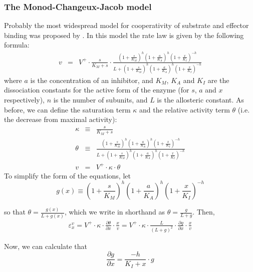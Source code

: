 \documentclass[12pt,a4paper]{article}
\begin{document}
\subsubsection{The Monod-Changeux-Jacob model}
Probably the most widespread model for cooperativity of substrate and effector binding was proposed by \citet{Monod1965-dq}. In this model the rate law is given by the following formula:
\begin{eqnarray}
v &=& V^+ \cdot \frac{s}{K_M + s} \cdot \frac{\left(1 + \frac{s}{K_M}\right)^h \left(1 + \frac{a}{K_A}\right)^h \left(1 + \frac{x}{K_I}\right)^{-h}}{L + \left(1 + \frac{s}{K_M}\right)^h \left(1 + \frac{a}{K_A}\right)^h \left(1 + \frac{x}{K_I}\right)^{-h}}
\end{eqnarray}
where $a$ is the concentration of an inhibitor, and $K_M$, $K_A$ and $K_I$ are the dissociation constants for the active form of the enzyme (for $s$, $a$ and $x$ respectively), $n$ is the number of subunits, and $L$ is the allosteric constant. As before, we can define the saturation term $\kappa$ and the relative activity term $\theta$ (i.e. the decrease from maximal activity):
\begin{eqnarray}
\kappa &\equiv& \frac{s}{K_M + s} \nonumber\\
\theta &\equiv& \frac{\left(1 + \frac{s}{K_M}\right)^h \left(1 + \frac{a}{K_A}\right)^h \left(1 + \frac{x}{K_I}\right)^{-h}}{L + \left(1 + \frac{s}{K_M}\right)^h \left(1 + \frac{a}{K_A}\right)^h \left(1 + \frac{x}{K_I}\right)^{-h}} \nonumber\\
v &=& V^+ \cdot \kappa \cdot \theta
\end{eqnarray}
To simplify the form of the equations, let 
\begin{equation}
g(x) \equiv \left(1 + \frac{s}{K_M}\right)^h \left(1 + \frac{a}{K_A}\right)^h \left(1 + \frac{x}{K_I}\right)^{-h}
\end{equation}

\noindent so that $\theta = \frac{g(x)}{L + g(x)}$, which we write in shorthand as $\theta= \frac{g}{L+g}$. Then, 
\begin{eqnarray}
\varepsilon_x^v = V^+ \cdot \kappa \cdot \frac{\partial\theta}{\partial x} \cdot \frac{x}{v} 
= V^+ \cdot \kappa \cdot \frac{L}{(L+g)^2} \cdot \frac{\partial g}{\partial x} \cdot \frac{x}{v}
\end{eqnarray}

Now, we can calculate that 
\begin{equation}
\frac{\partial g}{\partial x} = \frac{-h}{K_I + x} \cdot g
\end{equation}
\end{document}
